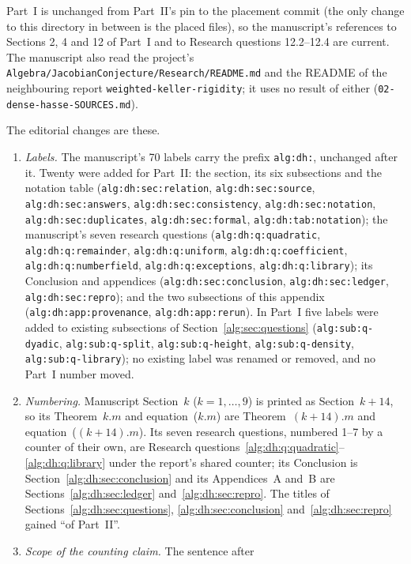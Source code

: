 \documentclass[11pt]{article}
\numberwithin{equation}{section}
\theoremstyle{plain}
\theoremstyle{plain}
\theoremstyle{plain}
\theoremstyle{definition}
\theoremstyle{definition}
\theoremstyle{definition}
\theoremstyle{remark}
\newcommand{\rpath}[1]{\nolinkurl{#1}}
\begin{document}
Part~I is unchanged from Part~II's pin to the placement commit (the only
change to this directory in between is the placed files), so the
manuscript's references to Sections 2, 4 and 12 of Part~I and to Research
questions 12.2--12.4 are current. The manuscript also read the
project's \rpath{Algebra/JacobianConjecture/Research/README.md} and the
README of the neighbouring report \rpath{weighted-keller-rigidity}; it
uses no result of either (\rpath{02-dense-hasse-SOURCES.md}).

The editorial changes are these.
\begin{enumerate}[label=(\arabic*)]
\item \emph{Labels.} The manuscript's 70 labels carry the prefix
\texttt{alg:dh:}, unchanged after it. Twenty were added for Part~II: the
section, its six subsections and the notation table
(\rpath{alg:dh:sec:relation}, \rpath{alg:dh:sec:source},
\rpath{alg:dh:sec:answers}, \rpath{alg:dh:sec:consistency},
\rpath{alg:dh:sec:notation}, \rpath{alg:dh:sec:duplicates},
\rpath{alg:dh:sec:formal}, \rpath{alg:dh:tab:notation}); the
manuscript's seven research questions (\rpath{alg:dh:q:quadratic},
\rpath{alg:dh:q:remainder}, \rpath{alg:dh:q:uniform},
\rpath{alg:dh:q:coefficient}, \rpath{alg:dh:q:numberfield},
\rpath{alg:dh:q:exceptions}, \rpath{alg:dh:q:library}); its
Conclusion and appendices (\rpath{alg:dh:sec:conclusion},
\rpath{alg:dh:sec:ledger}, \rpath{alg:dh:sec:repro}); and the two
subsections of this appendix (\rpath{alg:dh:app:provenance},
\rpath{alg:dh:app:rerun}). In Part~I five labels were added to
existing subsections of Section~\ref{alg:sec:questions}
(\rpath{alg:sub:q-dyadic}, \rpath{alg:sub:q-split},
\rpath{alg:sub:q-height}, \rpath{alg:sub:q-density},
\rpath{alg:sub:q-library}); no existing label was renamed or removed,
and no Part~I number moved.
\item \emph{Numbering.} Manuscript Section~$k$ ($k=1,\ldots,9$) is printed
as Section~$k+14$, so its Theorem~$k.m$ and equation~($k.m$) are
Theorem~$(k+14).m$ and equation~($(k+14).m$). Its seven research
questions, numbered 1--7 by a counter of their own, are Research
questions~\ref{alg:dh:q:quadratic}--\ref{alg:dh:q:library} under the
report's shared counter; its Conclusion is
Section~\ref{alg:dh:sec:conclusion} and its Appendices~A and~B are
Sections~\ref{alg:dh:sec:ledger} and~\ref{alg:dh:sec:repro}. The titles
of Sections~\ref{alg:dh:sec:questions}, \ref{alg:dh:sec:conclusion}
and~\ref{alg:dh:sec:repro} gained ``of Part~II''.
\item \emph{Scope of the counting claim.} The sentence after

\end{enumerate}
\end{document}
